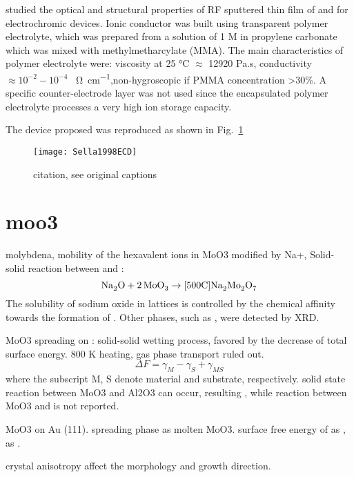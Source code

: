 \citeauthor{Sella1998} studied the optical and structural properties of RF sputtered thin film of  and  for electrochromic devices. Ionic conductor was built using transparent polymer electrolyte, which was prepared from a solution of 1 M  in propylene carbonate which was mixed with methylmetharcylate (MMA). The main characteristics of polymer electrolyte were: viscosity at 25 \si{\degreeCelsius} $\approx$ 12920 Pa.s, conductivity $\approx 10^{-2}-10^{-4}$ \si{\per\ohm\per cm},non-hygroscopic if PMMA concentration \textgreater 30\%. A specific counter-electrode layer was not used since the encapsulated polymer electrolyte processes a very high ion storage capacity.\cite{Sella1998}

The device proposed was reproduced as shown in Fig.~\ref{fig:Sella1998ECD}
\begin{figure}[htb]
    \centering
    \texttt{[image: Sella1998ECD]}
    \caption{citation, see original captions} \label{fig:Sella1998ECD}
\end{figure}


\chapter{moo3}

molybdena, mobility of the hexavalent  ions in MoO3 modified by Na+, \cite{El-Shobaky1998} Solid-solid reaction between  and : 
\[
\cee{Na2O + 2MoO3 \rightarrow[500 C] Na2Mo2O7}
\]
The solubility of sodium oxide in  lattices is controlled by the chemical affinity towards the formation of . Other phases, such as ,  were detected by XRD. 


MoO3 spreading on : solid-solid wetting process, favored by the decrease of total surface energy. 800 K heating, gas phase transport ruled out.\cite{Leyrer1990} 
\[
\Delta F = \gamma_M - \gamma_S + \gamma_{MS}
\]
where the subscript M, S denote material and substrate, respectively.
solid state reaction between MoO3 and Al2O3 can occur, resulting , while reaction between MoO3 and  is not reported. 

MoO3 on Au (111).\cite{Song2003} spreading phase as molten MoO3. surface free energy of  as ,  as . 

crystal anisotropy affect the morphology and growth direction. \cite{Schwarz2009} \cite{Schwarz2010} 

\cite{Dubrovskii2011} 

